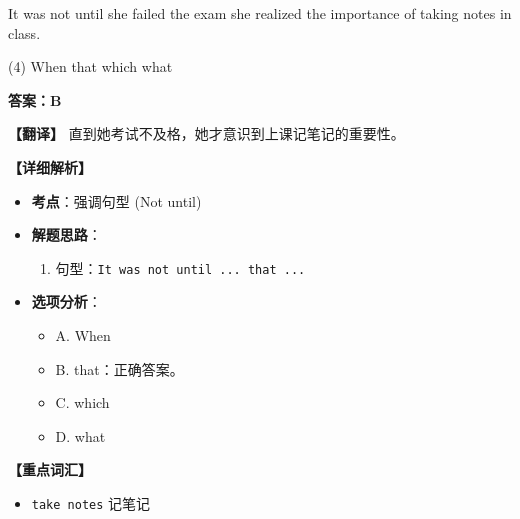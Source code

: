 \documentclass[11pt, a4paper]{article}
\newcommand{\analysis}[4]{
    \begin{solutionbox}
        \textbf{答案：#1}
        
        \textbf{【翻译】} #2
        
        \textbf{【详细解析】}
        #3
        
        \textbf{【重点词汇】}
        #4
    \end{solutionbox}
}
\newcommand{\blank}{\underline{\hspace{1.5cm}}}
\begin{document}
\begin{questions}
    \item It was not until she failed the exam \blank she realized the importance of taking notes in class.
    \begin{tasks}(4)
        \task When \task that \task which \task what
    \end{tasks}
    \analysis{B}{直到她考试不及格，她才意识到上课记笔记的重要性。}{
        \begin{itemize}
            \item \textbf{考点}：强调句型 (Not until)
            \item \textbf{解题思路}：
                \begin{enumerate}
                    \item 句型：\texttt{It was not until ... that ...}
                \end{enumerate}
            \item \textbf{选项分析}：
                \begin{itemize}
                    \item A. When
                    \item B. that：正确答案。
                    \item C. which
                    \item D. what
                \end{itemize}
        \end{itemize}
    }{
        \begin{itemize}
            \item \texttt{take notes} 记笔记
        \end{itemize}
    }


\end{questions}
\end{document}
